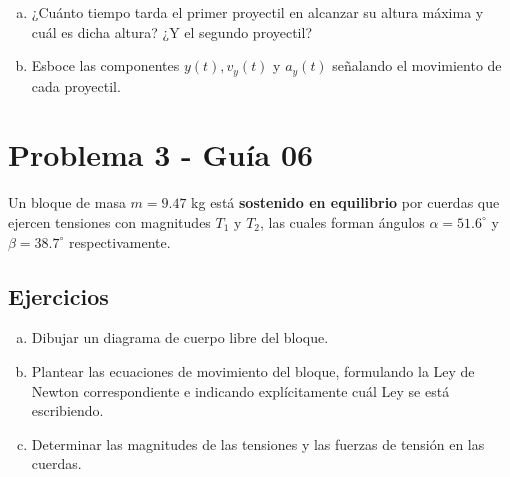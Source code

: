 \documentclass[12pt,tikz,border=3.14mm]{article}
\begin{document}
\begin{enumerate}[a),leftmargin=1cm]
			\item ¿Cuánto tiempo tarda el primer proyectil en alcanzar su altura máxima y cuál es dicha altura? ¿Y el segundo proyectil?
\newpage
			\item Esboce las componentes $y(t), v_{y}(t)$ y $a_{y}(t)$ señalando el movimiento de cada proyectil.
			\begin{center}
			
			
				\end{center}				
		\end{enumerate}
\section{Problema 3 - Guía 06}
	Un bloque de masa $m = 9.47$ kg está \textbf{sostenido en equilibrio} por cuerdas que ejercen tensiones con magnitudes $T_{1} \text{ y } T_{2}$, las cuales forman ángulos $\alpha = 51.6^{\circ}$ y $\beta = 38.7^{\circ} $ respectivamente.
		\subsection*{Ejercicios}
			\begin{enumerate}[a),leftmargin=1cm]
				\item Dibujar un diagrama de cuerpo libre del bloque.
				\item Plantear las ecuaciones de movimiento del bloque, formulando la Ley de Newton correspondiente e indicando explícitamente cuál Ley se está escribiendo.
				\item Determinar las magnitudes de las tensiones y las fuerzas de tensión en las cuerdas.
			\end{enumerate}
		
\end{document}
